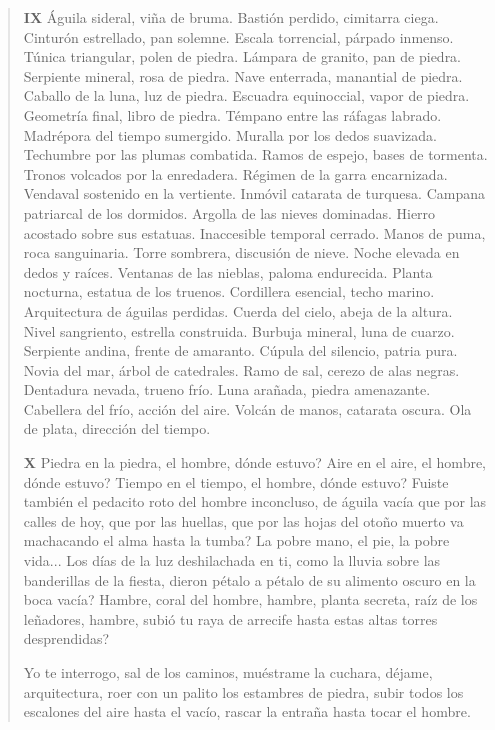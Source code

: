 \documentclass[12pt]{article}
\begin{document}
\begin{verse}
\vspace{\baselineskip}
{\scshape\bfseries IX}
Águila sideral, viña de bruma.  
Bastión perdido, cimitarra ciega.  
Cinturón estrellado, pan solemne.  
Escala torrencial, párpado inmenso.  
Túnica triangular, polen de piedra.  
Lámpara de granito, pan de piedra.  
Serpiente mineral, rosa de piedra.  
Nave enterrada, manantial de piedra.  
Caballo de la luna, luz de piedra.  
Escuadra equinoccial, vapor de piedra.  
Geometría final, libro de piedra.  
Témpano entre las ráfagas labrado.  
Madrépora del tiempo sumergido.  
Muralla por los dedos suavizada.  
Techumbre por las plumas combatida.  
Ramos de espejo, bases de tormenta.  
Tronos volcados por la enredadera.  
Régimen de la garra encarnizada.  
Vendaval sostenido en la vertiente.  
Inmóvil catarata de turquesa.  
Campana patriarcal de los dormidos.  
Argolla de las nieves dominadas.  
Hierro acostado sobre sus estatuas.  
Inaccesible temporal cerrado.  
Manos de puma, roca sanguinaria.  
Torre sombrera, discusión de nieve.  
Noche elevada en dedos y raíces.  
Ventanas de las nieblas, paloma endurecida.  
Planta nocturna, estatua de los truenos.  
Cordillera esencial, techo marino.  
Arquitectura de águilas perdidas.  
Cuerda del cielo, abeja de la altura.  
Nivel sangriento, estrella construida.  
Burbuja mineral, luna de cuarzo.  
Serpiente andina, frente de amaranto.  
Cúpula del silencio, patria pura.  
Novia del mar, árbol de catedrales.  
Ramo de sal, cerezo de alas negras.  
Dentadura nevada, trueno frío.  
Luna arañada, piedra amenazante.  
Cabellera del frío, acción del aire.  
Volcán de manos, catarata oscura.  
Ola de plata, dirección del tiempo.  

\vspace{\baselineskip}
{\scshape\bfseries X}
Piedra en la piedra, el hombre, dónde estuvo?  
Aire en el aire, el hombre, dónde estuvo?  
Tiempo en el tiempo, el hombre, dónde estuvo?  
Fuiste también el pedacito roto  
del hombre inconcluso, de águila vacía  
que por las calles de hoy, que por las huellas,  
que por las hojas del otoño muerto  
va machacando el alma hasta la tumba?  
La pobre mano, el pie, la pobre vida...  
Los días de la luz deshilachada  
en ti, como la lluvia  
sobre las banderillas de la fiesta,  
dieron pétalo a pétalo de su alimento oscuro  
en la boca vacía?  
	 Hambre, coral del hombre,  
hambre, planta secreta, raíz de los leñadores,  
hambre, subió tu raya de arrecife  
hasta estas altas torres desprendidas?  
	
Yo te interrogo, sal de los caminos,  
muéstrame la cuchara, déjame, arquitectura,  
roer con un palito los estambres de piedra,  
subir todos los escalones del aire hasta el vacío,  
rascar la entraña hasta tocar el hombre.  
	

\end{verse}
\end{document}
